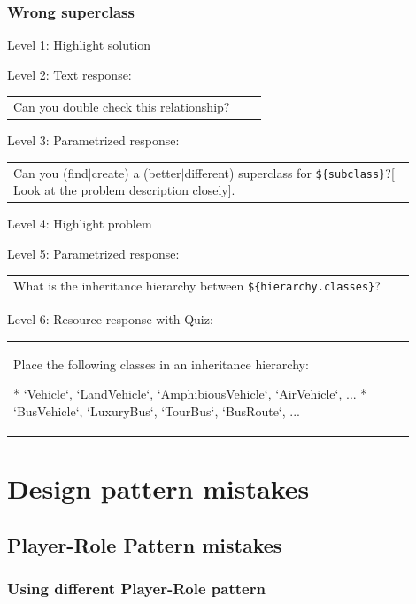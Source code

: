 \subsubsection{Wrong superclass}

\noindent Level 1: Highlight solution \medskip

\noindent Level 2: Text response: \medskip

\begin{tabular}{|p{0.9\linewidth}}
Can you double check this relationship?
\end{tabular} \medskip

\noindent Level 3: Parametrized response: \medskip

\begin{tabular}{|p{0.9\linewidth}}
Can you (find$|$create) a (better$|$different) superclass for \verb|${subclass}|?[ Look at the problem description closely].
\end{tabular} \medskip

\noindent Level 4: Highlight problem \medskip

\noindent Level 5: Parametrized response: \medskip

\begin{tabular}{|p{0.9\linewidth}}
What is the inheritance hierarchy between \verb|${hierarchy.classes}|?
\end{tabular} \medskip

\noindent Level 6: Resource response with Quiz: \medskip

\begin{tabular}{|p{0.9\linewidth}}
Place the following classes in an inheritance hierarchy:

* `Vehicle`, `LandVehicle`, `AmphibiousVehicle`, `AirVehicle`, ...
* `BusVehicle`, `LuxuryBus`, `TourBus`, `BusRoute`, ...
\end{tabular} \medskip




\section{Design pattern mistakes}

\subsection{Player-Role Pattern mistakes}

\subsubsection{Using different Player-Role pattern}

